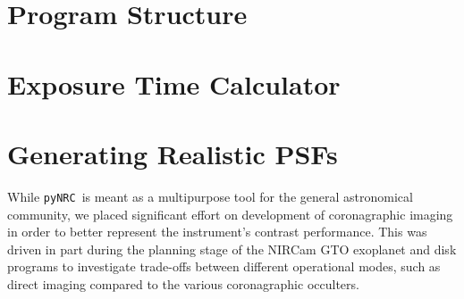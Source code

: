 \documentclass[modern, linenumbers]{aastex62}
\newcommand{\pynrc}{\texttt{\MakeLowercase{py}NRC}}
\begin{document}

\section{Program Structure}



\section{Exposure Time Calculator}



\section{Generating Realistic PSFs}

While \pynrc\ is meant as a multipurpose tool for the general astronomical community, we placed significant effort on development of coronagraphic imaging in order to better represent the instrument's contrast performance. 
This was driven in part during the planning stage of the NIRCam GTO exoplanet and disk programs to investigate trade-offs between different operational modes, such as direct imaging compared to the various coronagraphic occulters.
\end{document}
